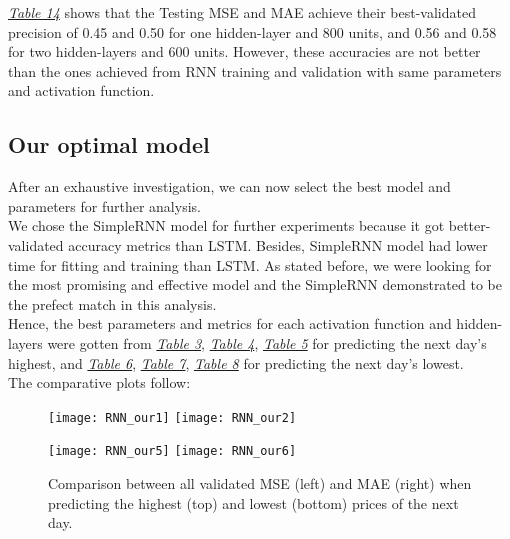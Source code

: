 \hyperref[table:Results for LSTM, Tanh, Low]{\textit{Table 14}} shows that the Testing MSE and MAE achieve their best-validated precision of 0.45 and 0.50 for one hidden-layer and 800 units, and 0.56 and 0.58 for two hidden-layers and 600 units. However, these accuracies are not better than the ones achieved from RNN training and validation with same parameters and activation function.\\

\subsection{Our optimal model}
\label{chap:Our optimal model}

\quad After an exhaustive investigation, we can now select the best model and parameters for further analysis.\\

We chose the SimpleRNN model for further experiments because it got better-validated accuracy metrics than LSTM. Besides, SimpleRNN model had lower time for fitting and training than LSTM. As stated before, we were looking for the most promising and effective model and the SimpleRNN demonstrated to be the prefect match in this analysis.\\

Hence, the best parameters and metrics for each activation function and hidden-layers were gotten from \hyperref[table:Results for RNN, Sigmoid, High]{\textit{Table 3}}, \hyperref[table:Results for RNN, Tanh, High]{\textit{Table 4}}, \hyperref[table:Results for RNN, ReLu, High]{\textit{Table 5}} for predicting the next day's highest, and \hyperref[table:Results for RNN, Sigmoid, Low]{\textit{Table 6}}, \hyperref[table:Results for RNN, Tanh, Low]{\textit{Table 7}}, \hyperref[table:Results for RNN, ReLu, Low]{\textit{Table 8}} for predicting the next day's lowest.\\

The comparative plots follow:

\begin{figure}[H]
\label{fig:RNN Comparison for highest}
\centering
\texttt{[image: RNN\_our1]}
\texttt{[image: RNN\_our2]}
\end{figure}

\begin{figure}[H]
\label{fig:RNN Comparison for lowest}
\centering
\texttt{[image: RNN\_our5]}
\texttt{[image: RNN\_our6]}
\caption{Comparison between all validated MSE (left) and MAE (right) when predicting the highest (top) and lowest (bottom) prices of the next day.}
\end{figure}\\

